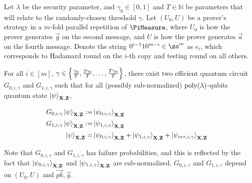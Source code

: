 \begin{lemma}\label{lem:partition2}
	Let $\lambda$ be the security parameter, and $\gamma_0 \in[0,1]$ and $T\in \mathbb{N}$ be parameters that will relate to the randomly-chosen threshold $\gamma$.
	Let $(U_0,U)$ be a prover's strategy in a $m$-fold parallel repetition of $\PiMeasure$, where $U_0$ is how the prover generates $\vec{y}$ on the second message, and $U$ is how the prover generates $\vec{a}$ on the fourth message. Denote the string $0^{i-1}10^{m-i} \in \zo^m $ as $e_i$, which corresponds to Hadamard round on the $i$-th copy and testing round on all others.

	For all $i\in[m]$, $\gamma \in \left\{\frac{\gamma_0}{T},\frac{2\gamma_0}{T},\dots,\frac{T\gamma_0}{T}\right\}$, there exist two efficient quantum circuit  $G_{0,i,\gamma}$ and $G_{1,i,\gamma}$ such that for all (possibly sub-normalized) $\operatorname*{\operatorname{poly}}(\lambda)$-qubits quantum state $\ket{\psi}_{\mathbf{X},\mathbf{Z}}$,  

	\begin{align}
		G_{0,i,\gamma}\ket{\psi}_{\mathbf{X},\mathbf{Z}} :=& \ket{\psi_{0,i,\gamma}}_{\mathbf{X},\mathbf{Z}} \\ G_{1,i,\gamma}\ket{\psi}_{\mathbf{X},\mathbf{Z}} :=& \ket{\psi_{1,i,\gamma}}_{\mathbf{X},\mathbf{Z}}  \\
		\ket{\psi}_{\mathbf{X},\mathbf{Z}} =&   \ket{\psi_{0,i,\gamma}}_{\mathbf{X},\mathbf{Z}}+ \ket{\psi_{1,i,\gamma}}_{\mathbf{X},\mathbf{Z}}+\ket{\psi_{err,i,\gamma}}_{\mathbf{X},\mathbf{Z}}
	\end{align}

	Note that $G_{0,i,\gamma}$ and $G_{1,i,\gamma}$ has failure probabilities, and this is reflected by the fact that $\ket{\psi_{0,i,\gamma}}_{\mathbf{X},\mathbf{Z}}$ and $\ket{\psi_{1,i,\gamma}}_{\mathbf{X},\mathbf{Z}}$ are  sub-normalized. $G_{0,i,\gamma}$ and $G_{1,i,\gamma}$ depend on $(U_0,U)$ and $\vec{pk},\vec{y}$.


\end{lemma}
